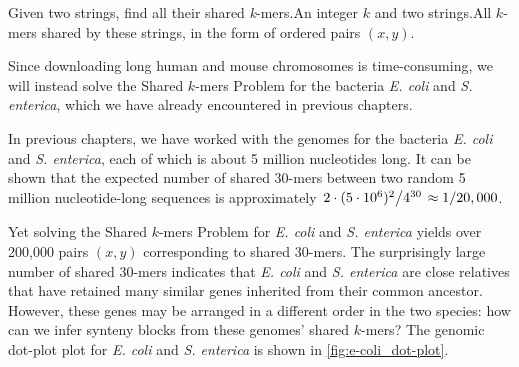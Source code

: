 \begin{exercise}\end{exercise}

\begin{problem}{Given two strings, find all their shared \textit{k}-mers.}{An integer $k$ and two strings.}{All $k$-mers shared by these strings, in the form of ordered pairs $(x, y)$.}
\protect{}
\end{problem}

\noindent Since downloading long human and mouse chromosomes is time-consuming, we will instead solve the Shared $k$-mers Problem for the bacteria \textit{E. coli} and \textit{S. enterica}, which we have already encountered in previous chapters.\\

\begin{exercise}\end{exercise}

\noindent In previous chapters, we have worked with the genomes for the bacteria \textit{E. coli} and \textit{S. enterica}, each of which is about 5 million nucleotides long.  It can be shown that the expected number of shared 30-mers between two random 5 million nucleotide-long sequences is approximately $\left. 2 \cdot (5 \cdot 10^6)^2 \middle/ 4^{30}\right. \approx 1/20,000$.

Yet solving the Shared $k$-mers Problem for \textit{E. coli} and \textit{S. enterica} yields over 200,000 pairs $(x,y)$ corresponding to shared 30-mers. The surprisingly large number of shared 30-mers indicates that \textit{E. coli} and \textit{S. enterica} are close relatives that have retained many similar genes inherited from their common ancestor. However, these genes may be arranged in a different order in the two species: how can we infer synteny blocks from these genomes' shared $k$-mers? The genomic dot-plot plot for \textit{E. coli} and \textit{S. enterica} is shown in \autoref{fig:e-coli_dot-plot}.\par

